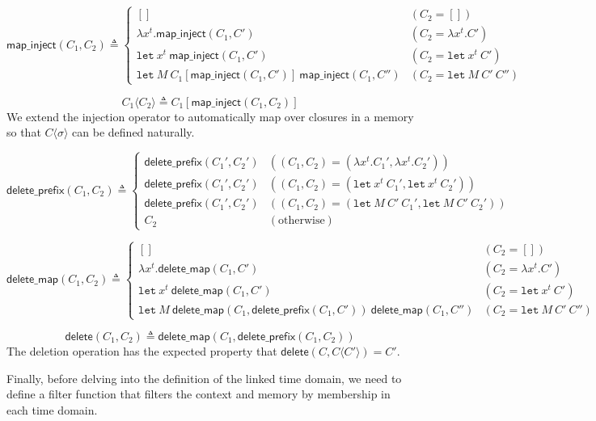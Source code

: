 \documentclass{article}
\theoremstyle{definition}
\newcommand*{\mapinject}{\mathsf{map\_inject}}
\newcommand*{\inject}[2]{{#1}\langle{#2}\rangle}
\newcommand*{\deletepre}{\mathsf{delete\_prefix}}
\newcommand*{\deletemap}{\mathsf{delete\_map}}
\newcommand*{\delete}{\mathsf{delete}}
\newcommand*{\Let}{\mathtt{let}}
\begin{document}
\[
  \mapinject(C_{1},C_{2})\triangleq
  \begin{cases}
    []                                                          & (C_{2}=[])                \\
    \lambda x^{t}. \mapinject(C_{1},C')                         & (C_{2}=\lambda x^{t}. C') \\
    \Let\:x^{t}\:\mapinject(C_{1},C')                           & (C_{2}=\Let\:x^{t}\:C')   \\
    \Let\:M\:C_{1}[\mapinject(C_{1},C')]\:\mapinject(C_{1},C'') & (C_{2}=\Let\:M\:C'\:C'')
  \end{cases}
\]

\[
  \inject{C_{1}}{C_{2}}\triangleq C_{1}[\mapinject(C_{1},C_{2})]
\]
We extend the injection operator to automatically map over closures in a memory so that $\inject{C}{\sigma}$ can be defined naturally.

\[
  \deletepre(C_{1},C_{2})\triangleq
  \begin{cases}
    \deletepre(C_{1}',C_{2}') & ((C_{1},C_{2})=(\lambda x^{t}.C_{1}',\lambda x^{t}.C_{2}')) \\
    \deletepre(C_{1}',C_{2}') & ((C_{1},C_{2})=(\Let\: x^{t}\:C_{1}',\Let\:x^{t}\:C_{2}'))  \\
    \deletepre(C_{1}',C_{2}') & ((C_{1},C_{2})=(\Let\:M\:C'\:C_{1}',\Let\:M\:C'\:C_{2}'))   \\
    C_{2}                     & (\text{otherwise})
  \end{cases}
\]

\[
  \deletemap(C_{1},C_{2})\triangleq
  \begin{cases}
    []                                                                     & (C_{2}=[])               \\
    \lambda x^{t}.\deletemap(C_{1},C')                                     & (C_{2}=\lambda x^{t}.C') \\
    \Let\:x^{t}\:\deletemap(C_{1},C')                                      & (C_{2}=\Let\:x^{t}\:C')  \\
    \Let\:M\:\deletemap(C_{1},\deletepre(C_{1},C'))\:\deletemap(C_{1},C'') & (C_{2}=\Let\:M\:C'\:C'')
  \end{cases}
\]

\[
  \delete(C_{1},C_{2})\triangleq \deletemap(C_{1},\deletepre(C_{1},C_{2}))
\]
The deletion operation has the expected property that $\delete(C,\inject{C}{C'})=C'$.

Finally, before delving into the definition of the linked time domain, we need to define a filter function that filters the context and memory by membership in each time domain.
\end{document}
